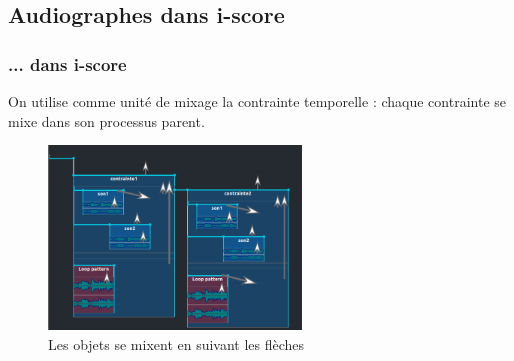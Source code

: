 \documentclass{beamer}
\begin{document}
\subsection{Audiographes dans i-score}
\begin{frame}
	\frametitle{... dans i-score}    
	\Large
	
    On utilise comme unité de mixage la contrainte temporelle : 
    chaque contrainte se mixe dans son processus parent.
	
	\begin{figure}
		\centering
		\includegraphics[width=0.6\textwidth]{images/mixage.png}
		\caption{Les objets se mixent en suivant les flèches}
	\end{figure}
\end{frame}
\end{document}
